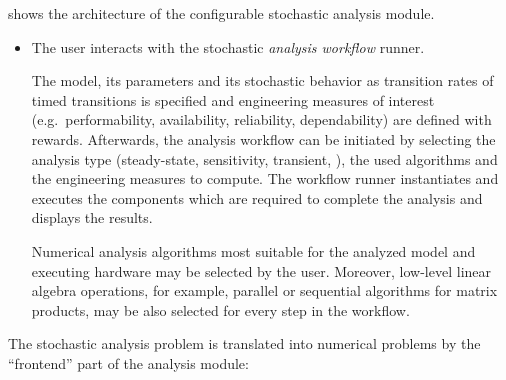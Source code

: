  shows the architecture of the configurable
stochastic analysis module.
\begin{itemize}
\item The user interacts with the stochastic \emph{analysis
    workflow} runner.

  The model, its parameters and its stochastic behavior as transition
  rates of timed transitions is specified and engineering measures of
  interest (e.g.~performability, availability, reliability,
  dependability) are defined with  rewards. Afterwards,
  the analysis workflow can be initiated by selecting the analysis
  type (steady-state, sensitivity, transient, ), the used
  algorithms and the engineering measures to compute. The workflow
  runner instantiates and executes the components which are required
  to complete the analysis and displays the results.

  Numerical analysis algorithms most suitable for the analyzed model
  and executing hardware may be selected by the user. Moreover,
  low-level linear algebra operations, for example, parallel or
  sequential algorithms for matrix products, may be also selected for
  every step in the workflow.
\end{itemize}
The stochastic analysis problem is translated into numerical problems
by the ``frontend'' part of the analysis module:
